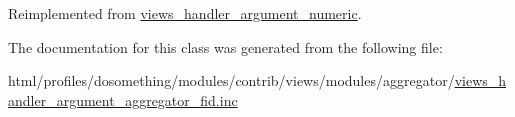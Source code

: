 Reimplemented from \hyperlink{classviews__handler__argument__numeric_a5c6f566b06bad6057e92f15d82311c7b}{views\_\-handler\_\-argument\_\-numeric}.

The documentation for this class was generated from the following file:\begin{DoxyCompactItemize}
\item 
html/profiles/dosomething/modules/contrib/views/modules/aggregator/\hyperlink{views__handler__argument__aggregator__fid_8inc}{views\_\-handler\_\-argument\_\-aggregator\_\-fid.inc}\end{DoxyCompactItemize}
